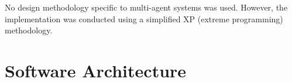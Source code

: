 \documentclass{llncs2e/llncs}
\begin{document}
    No design methodology specific to multi-agent systems was used. However, 
    the implementation was conducted using a simplified XP (extreme programming) 
    methodology.

\section{Software Architecture}
\end{document}
